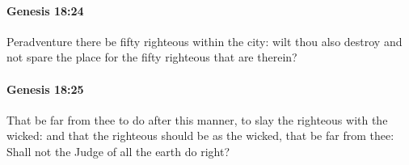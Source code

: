 		\paragraph{Genesis 18:24} %
			\label{GENESIS-18-24}

			Peradventure there be fifty righteous within the city: wilt thou also destroy and not spare the place for the fifty righteous that are therein?


		\paragraph{Genesis 18:25} %
			\label{GENESIS-18-25}

			That be far from thee to do after this manner, to slay the righteous with the wicked: and that the righteous should be as the wicked, that be far from thee: Shall not the Judge of all the earth do right?


